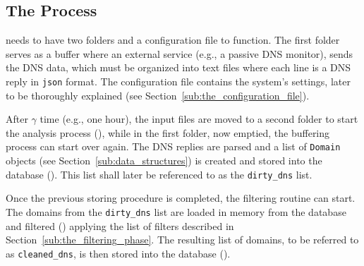 \subsection{The Process} %
\label{sub:the_process}

\thesystem needs to have two folders and a configuration file to function.
The first folder serves as a buffer where an external service (e.g., a passive DNS
monitor), sends the DNS data, which must be organized into text files where each
line is a DNS reply in \texttt{json} format.
The configuration file contains the system's settings, later to be thoroughly
explained (see Section~\ref{sub:the_configuration_file}).

After $\gamma$ time (e.g., one hour), the input files are moved to a second folder
to start the analysis process (), while in the first folder, now emptied, the
buffering process can start over again. The DNS replies are parsed and
a list of \texttt{Domain} objects (see Section~\ref{sub:data_structures}) is created and
stored into the database ().
This list shall later be referenced to as the \texttt{dirty\_dns} list.

Once the previous storing procedure is completed, the filtering routine can start.
The domains from the \texttt{dirty\_dns} list are loaded in memory from the
database and filtered () applying the
list of filters described in Section~\ref{sub:the_filtering_phase}. The resulting list
of domains, to be referred to as \texttt{cleaned\_dns}, is then stored into the
database ().

